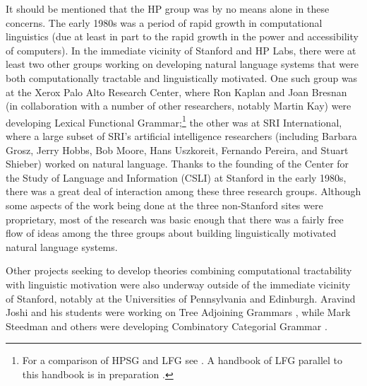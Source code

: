 \documentclass[output=paper,biblatex,babelshorthands,newtxmath,draftmode,colorlinks,citecolor=brown]{langscibook}
\begin{document}
It should be mentioned that the HP group was by no means alone in these concerns.  The early 1980s
was a period of rapid growth in computational linguistics (due at least in part to the rapid growth
in the power and accessibility of computers).  In the immediate vicinity of Stanford and HP Labs,
there were at least two other groups working on developing natural language systems that were both
computationally tractable and linguistically motivated.  One such group was at the Xerox Palo Alto
Research Center, where Ron Kaplan and Joan Bresnan (in
collaboration with a number of other researchers, notably Martin Kay) were
developing Lexical Functional Grammar\indexlfg;\footnote{For a comparison of HPSG and LFG see
  . A handbook of LFG parallel to this handbook is in preparation
  \citep{LFGhandbook}.}  the other was at SRI International, where a large subset of SRI's
artificial intelligence researchers  (including Barbara Grosz, Jerry
Hobbs, Bob Moore, Hans Uszkoreit, Fernando Pereira, and Stuart Shieber) worked on natural language.  Thanks to the founding of the Center for the Study of
Language and Information (CSLI) at Stanford in the early 1980s, there was a great deal of
interaction among these three research groups.  Although some aspects of the work being done at the
three non-Stanford sites were proprietary, most of the research was basic enough that there was a
fairly free flow of ideas among the three groups about building linguistically motivated natural
language systems. 

Other projects seeking to develop theories combining computational tractability with linguistic
motivation were also underway outside of the immediate vicinity of Stanford, notably at the
Universities of Pennsylvania and Edinburgh.  Aravind Joshi and his students were working on Tree
Adjoining Grammars \citep*{JLT75a-u,Joshi87a-u}, while Mark Steedman and others were developing
Combinatory Categorial Grammar \citep{Steedman87a-u,Steedman90a-u}.
\end{document}
